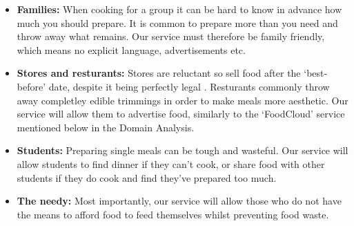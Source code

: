 \documentclass[12pt]{article}
\begin{document}
\begin{itemize}
	\item \textbf{Families:} When cooking for a group it can be hard to know in advance how much you should prepare.
			It is common to prepare more than you need and throw away what remains.
			Our service must therefore be family friendly, which means no explicit language, advertisements etc.
	\item \textbf{Stores and resturants:} Stores are reluctant so sell food after the `best-before' date, despite it being perfectly legal \cite{govuk}.
			Resturants commonly throw away completley edible trimmings in order to make meals more aesthetic. Our service will allow them to advertise food,
			similarly to the `FoodCloud' service mentioned below in the Domain Analysis.
	\item \textbf{Students:} Preparing single meals can be tough and wasteful. Our service will allow students to find dinner if they can't cook, or share food
			with other students if they do cook and find they've prepared too much.
	\item \textbf{The needy:} Most importantly, our service will allow those who do not have the means to afford food to feed themselves whilst preventing food waste.
\end{itemize}
\end{document}
